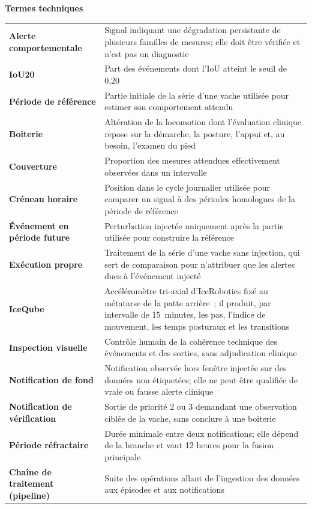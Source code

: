 \newpage

\noindent\textbf{Termes techniques}

\vspace{0.5em}

\begin{longtable}{@{}lp{11cm}@{}}
\textbf{Alerte comportementale} & Signal indiquant une dégradation persistante de plusieurs familles de mesures; elle doit être vérifiée et n'est pas un diagnostic \\[3pt]
\textbf{IoU20} & Part des événements dont l'IoU atteint le seuil de 0,20 \\[3pt]
\textbf{Période de référence} & Partie initiale de la série d'une vache utilisée pour estimer son comportement attendu \\[3pt]
\textbf{Boiterie} & Altération de la locomotion dont l'évaluation clinique repose sur la démarche, la posture, l'appui et, au besoin, l'examen du pied \\[3pt]
\textbf{Couverture} & Proportion des mesures attendues effectivement observées dans un intervalle \\[3pt]
\textbf{Créneau horaire} & Position dans le cycle journalier utilisée pour comparer un signal à des périodes homologues de la période de référence \\[3pt]
\textbf{Événement en période future} & Perturbation injectée uniquement après la partie utilisée pour construire la référence \\[3pt]
\textbf{Exécution propre} & Traitement de la série d'une vache sans injection, qui sert de comparaison pour n'attribuer que les alertes dues à l'événement injecté \\[3pt]
\textbf{IceQube} & Accéléromètre tri-axial d'IceRobotics fixé au métatarse de la patte arrière~; il produit, par intervalle de 15~minutes, les pas, l'indice de mouvement, les temps posturaux et les transitions \\[3pt]
\textbf{Inspection visuelle} & Contrôle humain de la cohérence technique des événements et des sorties, sans adjudication clinique \\[3pt]
\textbf{Notification de fond} & Notification observée hors fenêtre injectée sur des données non étiquetées; elle ne peut être qualifiée de vraie ou fausse alerte clinique \\[3pt]
\textbf{Notification de vérification} & Sortie de priorité 2 ou 3 demandant une observation ciblée de la vache, sans conclure à une boiterie \\[3pt]
\textbf{Période réfractaire} & Durée minimale entre deux notifications; elle dépend de la branche et vaut 12 heures pour la fusion principale \\[3pt]
\textbf{Chaîne de traitement (pipeline)} & Suite des opérations allant de l'ingestion des données aux épisodes et aux notifications \\[3pt]
\end{longtable}
